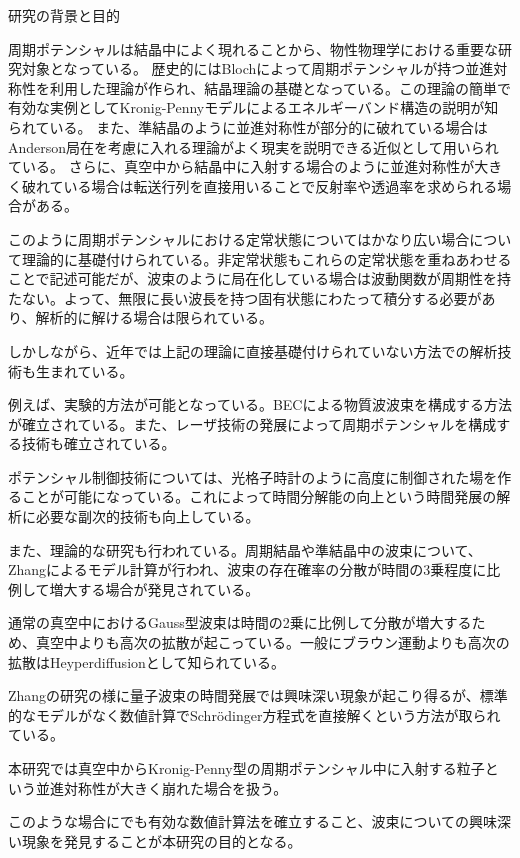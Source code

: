 \documentclass[a4paper, lualatex]{bxjsarticle}
\begin{document}
\begin{section}{研究の背景と目的}
    \par 周期ポテンシャルは結晶中によく現れることから、物性物理学における重要な研究対象となっている。 歴史的にはBlochによって周期ポテンシャルが持つ並進対称性を利用した理論が作られ、結晶理論の基礎となっている。この理論の簡単で有効な実例としてKronig-Pennyモデルによるエネルギーバンド構造の説明が知られている。 また、準結晶のように並進対称性が部分的に破れている場合はAnderson局在を考慮に入れる理論がよく現実を説明できる近似として用いられている。 さらに、真空中から結晶中に入射する場合のように並進対称性が大きく破れている場合は転送行列を直接用いることで反射率や透過率を求められる場合がある。
    \par このように周期ポテンシャルにおける定常状態についてはかなり広い場合について理論的に基礎付けられている。非定常状態もこれらの定常状態を重ねあわせることで記述可能だが、波束のように局在化している場合は波動関数が周期性を持たない。よって、無限に長い波長を持つ固有状態にわたって積分する必要があり、解析的に解ける場合は限られている。
    \par しかしながら、近年では上記の理論に直接基礎付けられていない方法での解析技術も生まれている。
    \par 例えば、実験的方法が可能となっている。BECによる物質波波束を構成する方法が確立されている。また、レーザ技術の発展によって周期ポテンシャルを構成する技術も確立されている。
    \par ポテンシャル制御技術については、光格子時計のように高度に制御された場を作ることが可能になっている。これによって時間分解能の向上という時間発展の解析に必要な副次的技術も向上している。
    \par また、理論的な研究も行われている。周期結晶や準結晶中の波束について、Zhangによるモデル計算が行われ、波束の存在確率の分散が時間の3乗程度に比例して増大する場合が発見されている。
    \par 通常の真空中におけるGauss型波束は時間の2乗に比例して分散が増大するため、真空中よりも高次の拡散が起こっている。一般にブラウン運動よりも高次の拡散はHeyperdiffusionとして知られている。
    \par Zhangの研究の様に量子波束の時間発展では興味深い現象が起こり得るが、標準的なモデルがなく数値計算でSchrödinger方程式を直接解くという方法が取られている。
    \par 本研究では真空中からKronig-Penny型の周期ポテンシャル中に入射する粒子という並進対称性が大きく崩れた場合を扱う。
    \par このような場合にでも有効な数値計算法を確立すること、波束についての興味深い現象を発見することが本研究の目的となる。
\end{section}
\end{document}
